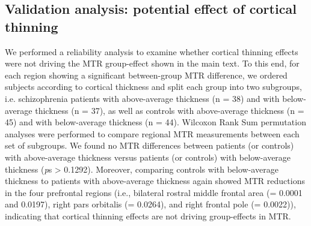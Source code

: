 \begin{refsection}
\subsection*{Validation analysis: potential effect of cortical thinning}
We performed a reliability analysis to examine whether cortical thinning effects were not driving the MTR group-effect shown in the main text. To this end, for each region showing a significant between-group MTR difference, we ordered subjects according to cortical thickness and split each group into two subgroups, i.e. schizophrenia patients with above-average thickness (n = 38) and with below-average thickness (n = 37), as well as controls with above-average thickness (n = 45) and with below-average thickness (n = 44). Wilcoxon Rank Sum permutation analyses were performed to compare regional MTR measurements between each set of subgroups. We found no MTR differences between patients (or controls) with above-average thickness versus patients (or controls) with below-average thickness (\textit{p}s > 0.1292). Moreover, comparing controls with below-average thickness to patients with above-average thickness again showed MTR reductions in the four prefrontal regions (i.e., bilateral rostral middle frontal area (\pval = 0.0001 and 0.0197), right pars orbitalis (\pval = 0.0264), and right frontal pole (\pval = 0.0022)), indicating that cortical thinning effects are not driving group-effects in MTR.


\end{refsection}
